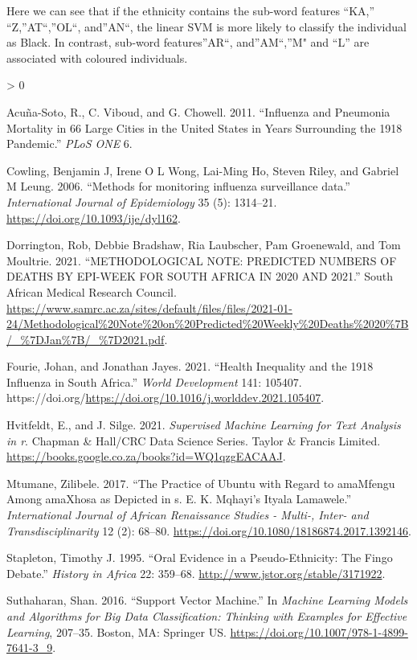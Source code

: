 \documentclass[fleqn,10pt,lineno]{wlpeerj} %
\newlength{\cslhangindent}
\newenvironment{CSLReferences}[2] %
 {%
  \setlength{\parindent}{0pt}
  \ifodd #1 \everypar{\setlength{\hangindent}{\cslhangindent}}\ignorespaces\fi
  \ifnum #2 > 0
  \setlength{\parskip}{#2\baselineskip}
  \fi
 }%
 {}
\begin{document}
Here we can see that if the ethnicity contains the sub-word features ``KA,'' ``Z,''AT``,''OL``, and''AN``, the linear SVM is more likely to classify the individual as Black. In contrast, sub-word features''AR``, and''AM``,''M" and ``L'' are associated with coloured individuals.

\hypertarget{refs}{}
\begin{CSLReferences}{1}{0}
\leavevmode\hypertarget{ref-AcuaSoto2011InfluenzaAP}{}%
Acuña-Soto, R., C. Viboud, and G. Chowell. 2011. {``Influenza and Pneumonia Mortality in 66 Large Cities in the United States in Years Surrounding the 1918 Pandemic.''} \emph{PLoS ONE} 6.

\leavevmode\hypertarget{ref-Cowling2006}{}%
Cowling, Benjamin J, Irene O L Wong, Lai-Ming Ho, Steven Riley, and Gabriel M Leung. 2006. {``{Methods for monitoring influenza surveillance data}.''} \emph{International Journal of Epidemiology} 35 (5): 1314--21. \url{https://doi.org/10.1093/ije/dyl162}.

\leavevmode\hypertarget{ref-Dorrington2021}{}%
Dorrington, Rob, Debbie Bradshaw, Ria Laubscher, Pam Groenewald, and Tom Moultrie. 2021. {``{METHODOLOGICAL NOTE: PREDICTED NUMBERS OF DEATHS BY EPI-WEEK FOR SOUTH AFRICA IN 2020 AND 2021}.''} South African Medical Research Council. \url{https://www.samrc.ac.za/sites/default/files/files/2021-01-24/Methodological\%20Note\%20on\%20Predicted\%20Weekly\%20Deaths\%2020\%7B/_\%7DJan\%7B/_\%7D2021.pdf}.

\leavevmode\hypertarget{ref-FOURIE2021105407}{}%
Fourie, Johan, and Jonathan Jayes. 2021. {``Health Inequality and the 1918 Influenza in South Africa.''} \emph{World Development} 141: 105407. https://doi.org/\url{https://doi.org/10.1016/j.worlddev.2021.105407}.

\leavevmode\hypertarget{ref-hvitfeldt2021supervised}{}%
Hvitfeldt, E., and J. Silge. 2021. \emph{Supervised Machine Learning for Text Analysis in r}. Chapman \& Hall/CRC Data Science Series. Taylor \& Francis Limited. \url{https://books.google.co.za/books?id=WQ1qzgEACAAJ}.

\leavevmode\hypertarget{ref-Mtumane}{}%
Mtumane, Zilibele. 2017. {``The Practice of Ubuntu with Regard to amaMfengu Among amaXhosa as Depicted in s. E. K. Mqhayi's Ityala Lamawele.''} \emph{International Journal of African Renaissance Studies - Multi-, Inter- and Transdisciplinarity} 12 (2): 68--80. \url{https://doi.org/10.1080/18186874.2017.1392146}.

\leavevmode\hypertarget{ref-Stapleton}{}%
Stapleton, Timothy J. 1995. {``Oral Evidence in a Pseudo-Ethnicity: The Fingo Debate.''} \emph{History in Africa} 22: 359--68. \url{http://www.jstor.org/stable/3171922}.

\leavevmode\hypertarget{ref-Suthaharan2016}{}%
Suthaharan, Shan. 2016. {``Support Vector Machine.''} In \emph{Machine Learning Models and Algorithms for Big Data Classification: Thinking with Examples for Effective Learning}, 207--35. Boston, MA: Springer US. \url{https://doi.org/10.1007/978-1-4899-7641-3_9}.

\end{CSLReferences}
\end{document}
